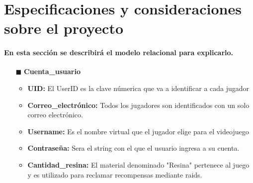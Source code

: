 \documentclass{report}
\begin{document}
\section{Especificaciones y consideraciones sobre el proyecto}
\paragraph{En esta sección se describirá el modelo relacional para explicarlo.}
\begin{itemize}
    \item[$\blacksquare$] \textbf{Cuenta\_usuario}
        \begin{itemize}
            \item \textbf {UID: } El UserID es la clave númerica que va a identificar a cada jugador
            \item \textbf{Correo\_electrónico:} Todos los jugadores son identificados con un solo correo electrónico.
            \item \textbf{Username: } Es el nombre virtual que el jugador elige para el videojuego
            \item \textbf{Contraseña: }Sera el string con el que el usuario ingresa a su cuenta.
            \item \textbf{Cantidad\_resina: } El material denominado "Resina" pertenece al juego y es utilizado para reclamar recompensas mediante raids.
            

\end{itemize}
\end{itemize}
\end{document}
